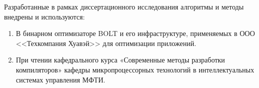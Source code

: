 \hfill \break

Разработанные в рамках диссертационного исследования алгоритмы и методы внедрены и используются:

\begin{enumerate}
  \item В бинарном оптимизаторе BOLT и его инфраструктуре, применяемых в ООО <<Техкомпания Хуавэй>> для оптимизации приложений.
  \item При чтении кафедрального курса «Современные методы разработки компиляторов» кафедры микропроцессорных технологий в интеллектуальных системах управления МФТИ.
\end{enumerate}

\newpage


